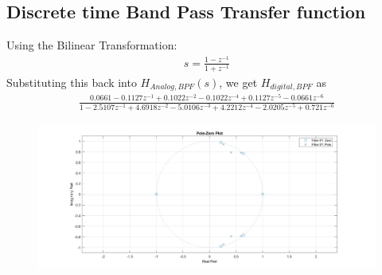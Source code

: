 \documentclass[12pt]{article}
\begin{document}
\color{cyan}
\subsection{Discrete time Band Pass Transfer function}
\color{black}
Using the Bilinear Transformation:
\begin{gather*}
	s = \frac{1-z^{-1}}{1+z^{-1}}
\end{gather*}
Substituting this back into $H_{Analog,BPF}(s)$, we get $H_{digital,BPF}$ as
\begin{gather*}
	\frac{0.0661 - 0.1127z^{-1} + 0.1022z^{-2} - 0.1022z^{-4} + 0.1127z^{-5} - 0.0661z^{-6} }{1 - 2.5107z^{-1} +4.6918z^{-2} - 5.0106z^{-3} + 4.2212z^{-4} - 2.0205z^{-5} + 0.721z^{-6}}
\end{gather*}

\begin{figure}[H]
	\centering
	\includegraphics[width = 18cm]{Filter3PZ.jpg}
\end{figure}
\end{document}
